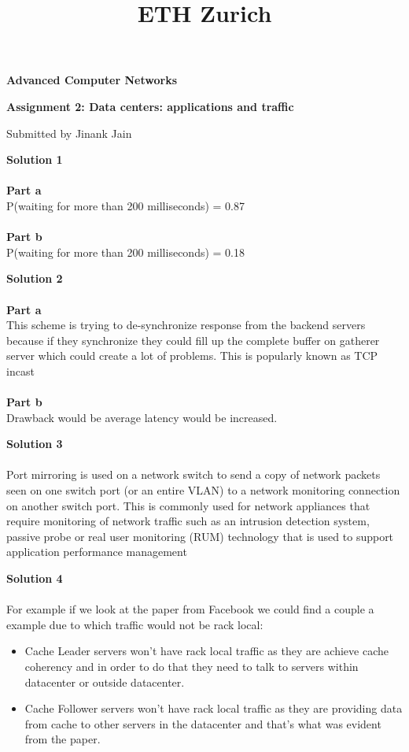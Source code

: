 \documentclass[letterpaper, 11pt]{article}
\title{ETH Zurich}
\begin{document}

\begin{center}
\Large \bf Advanced Computer Networks

\Large \bf Assignment 2: Data centers: applications and traffic

\large Submitted by Jinank Jain
\end{center}

\textbf{Solution 1}\\ \\
\textbf{Part a} \\
P(waiting for more than 200 milliseconds) = 0.87 \\ \\
\textbf{Part b} \\
P(waiting for more than 200 milliseconds) = 0.18
\bigskip

\textbf{Solution 2}\\ \\
\textbf{Part a} \\
This scheme is trying to de-synchronize response from the backend servers because if they synchronize they could fill up the complete buffer on gatherer server which could create a lot of problems. This is popularly known as TCP incast \\ \\
\textbf{Part b} \\
Drawback would be average latency would be increased.
\bigskip

\textbf{Solution 3}\\ \\
Port mirroring is used on a network switch to send a copy of network packets seen on one switch port (or an entire VLAN) to a network monitoring connection on another switch port. This is commonly used for network appliances that require monitoring of network traffic such as an intrusion detection system, passive probe or real user monitoring (RUM) technology that is used to support application performance management 
\bigskip

\textbf{Solution 4}\\ \\
For example if we look at the paper from Facebook we could find a couple a example due to which traffic would not be rack local:
\begin{itemize}
\item Cache Leader servers won't have rack local traffic as they are achieve cache coherency and in order to do that they need to talk to servers within datacenter or outside datacenter.
\item Cache Follower servers won't have rack local traffic as they are providing data from cache to other servers in the datacenter and that's what was evident from the paper.
\end{itemize}
\bigskip
\end{document}
